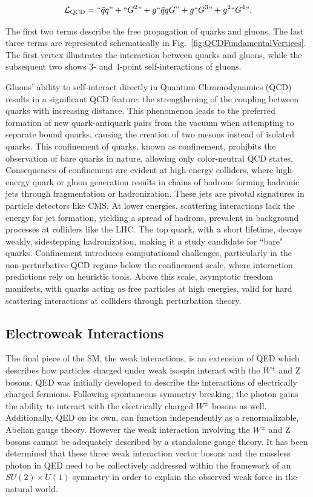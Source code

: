 \begin{equation}
    \label{eq:QCDSymbolic}
  \mathcal{L}_{\textnormal{QCD}} = ``\bar{q}q" + ``G^2" + g``\bar{q}{q}G" + g``G^{3}" + g^2``G^{4}".
\end{equation}

The first two terms describe the free propagation of quarks and gluons. The last three terms are represented schematically in Fig.~\ref{fig:QCDFundamentalVertices}. The first vertex illustrates the interaction between quarks and gluons, while the subsequent two shows 3- and 4-point self-interactions of gluons. 

Gluons' ability to self-interact directly in Quantum Chromodynamics (QCD) results in a significant QCD feature: the strengthening of the coupling between quarks with increasing distance. This phenomenon leads to the preferred formation of new quark-antiquark pairs from the vacuum when attempting to separate bound quarks, causing the creation of two mesons instead of isolated quarks. This confinement of quarks, known as confinement, prohibits the observation of bare quarks in nature, allowing only color-neutral QCD states. Consequences of confinement are evident at high-energy colliders, where high-energy quark or gluon generation results in chains of hadrons forming hadronic jets through fragmentation or hadronization. These jets are pivotal signatures in particle detectors like CMS. At lower energies, scattering interactions lack the energy for jet formation, yielding a spread of hadrons, prevalent in background processes at colliders like the LHC. The top quark, with a short lifetime, decays weakly, sidestepping hadronization, making it a study candidate for ``bare" quarks. Confinement introduces computational challenges, particularly in the non-perturbative QCD regime below the confinement scale, where interaction predictions rely on heuristic tools. Above this scale, asymptotic freedom manifests, with quarks acting as free particles at high energies, valid for hard scattering interactions at colliders through perturbation theory.

\subsection{Electroweak Interactions}

The final piece of the SM, the weak interactions, is an extension of QED which describes how particles charged under weak isospin interact with the $W^{\pm}$ and Z bosons. QED was initially developed to describe the interactions of electrically charged fermions. Following spontaneous symmetry breaking, the photon gains the ability to interact with the electrically charged $W^{\pm}$ bosons as well. Additionally, QED on its own, can function independently as a renormalizable, Abelian gauge theory. However the weak interaction involving the $W^{\pm}$ and Z bosons cannot be adequately described by a standalone gauge theory. It has been determined that these three weak interaction vector bosons and the massless photon in QED need to be collectively addressed within the framework of an $SU(2) \times U(1)$ symmetry in order to explain the observed weak force in the natural world. 

